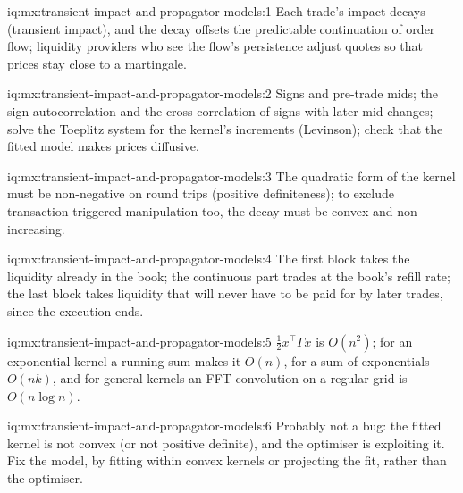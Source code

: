 \begin{solution}{iq:mx:transient-impact-and-propagator-models:1}
Each trade's impact decays (transient impact), and the decay offsets the predictable continuation of order flow; liquidity providers who see the flow's
persistence adjust quotes so that prices stay close to a martingale.
\end{solution}

\begin{solution}{iq:mx:transient-impact-and-propagator-models:2}
Signs and pre-trade mids; the sign autocorrelation and the cross-correlation of signs with later mid changes; solve the Toeplitz system for the kernel's
increments (Levinson); check that the fitted model makes prices diffusive.
\end{solution}

\begin{solution}{iq:mx:transient-impact-and-propagator-models:3}
The quadratic form of the kernel must be non-negative on round trips (positive definiteness); to exclude transaction-triggered manipulation too, the decay
must be convex and non-increasing.
\end{solution}

\begin{solution}{iq:mx:transient-impact-and-propagator-models:4}
The first block takes the liquidity already in the book; the continuous part trades at the book's refill rate; the last block takes liquidity that will
never have to be paid for by later trades, since the execution ends.
\end{solution}

\begin{solution}{iq:mx:transient-impact-and-propagator-models:5}
$\tfrac12x^\top\Gamma x$ is $O(n^2)$; for an exponential kernel a running sum makes it $O(n)$, for a sum of exponentials $O(nk)$, and for general kernels an
FFT convolution on a regular grid is $O(n\log n)$.
\end{solution}

\begin{solution}{iq:mx:transient-impact-and-propagator-models:6}
Probably not a bug: the fitted kernel is not convex (or not positive definite), and the optimiser is exploiting it. Fix the model, by fitting within
convex kernels or projecting the fit, rather than the optimiser.
\end{solution}

